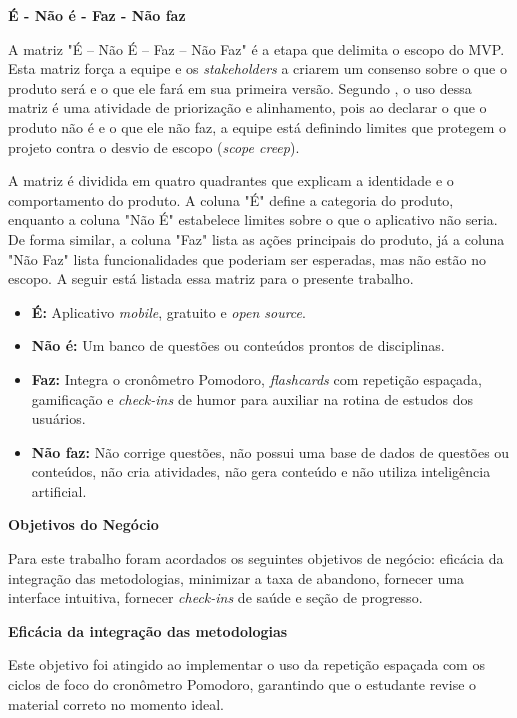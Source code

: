 \textbf{É - Não é - Faz - Não faz}

A matriz "É – Não É – Faz – Não Faz"  é a etapa que delimita o escopo do MVP.
Esta matriz força a equipe e os \textit{stakeholders} a criarem um consenso sobre o que o produto será e o que ele fará em sua primeira versão.
Segundo , o uso dessa matriz é uma atividade de priorização e alinhamento, pois ao declarar o que o produto não é e o que ele não faz, a equipe está definindo limites que protegem o projeto contra o desvio de escopo (\textit{scope creep}).

A matriz é dividida em quatro quadrantes que explicam a identidade e o comportamento do produto.
A coluna "É" define a categoria do produto, enquanto a coluna "Não É" estabelece limites sobre o que o aplicativo não seria.
De forma similar, a coluna "Faz" lista as ações principais do produto, já a coluna "Não Faz" lista funcionalidades que poderiam ser esperadas, mas não estão no escopo.
A seguir está listada essa matriz para o presente trabalho.

\begin{itemize}
    \item \textbf{É:} Aplicativo \textit{mobile}, gratuito e \textit{open source}.
    \item \textbf{Não é:} Um banco de questões ou conteúdos prontos de disciplinas.
    \item \textbf{Faz:} Integra o cronômetro Pomodoro, \textit{flashcards} com repetição espaçada, gamificação e \textit{check-ins} de humor para auxiliar na rotina de estudos dos usuários.
    \item \textbf{Não faz:} Não corrige questões, não possui uma base de dados de questões ou conteúdos, não cria atividades, não gera conteúdo e não utiliza inteligência artificial.
\end{itemize}

\textbf{Objetivos do Negócio}

Para este trabalho foram acordados os seguintes objetivos de negócio: eficácia da integração das metodologias, minimizar a taxa de abandono, fornecer uma interface intuitiva, fornecer \textit{check-ins} de saúde e seção de progresso.

\textbf{Eficácia da integração das metodologias}

Este objetivo foi atingido ao implementar o uso da repetição espaçada com os ciclos de foco do cronômetro Pomodoro, garantindo que o estudante revise o material correto no momento ideal.

